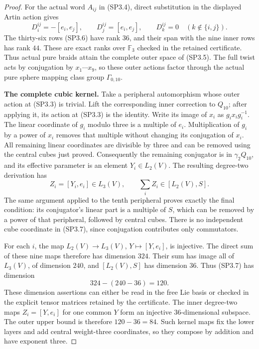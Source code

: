 \begin{proof}
For the actual word $A_{ij}$ in (SP3.4), direct substitution in
the displayed Artin action gives
\[
 D^{ij}_i=-[e_i,e_j],\qquad D^{ij}_j=[e_i,e_j],
 \qquad D^{ij}_k=0\quad(k\notin\{i,j\}).                \tag{SP3.6}
\]
The thirty-six rows (SP3.6) have rank $36$, and their span
with the nine inner rows has rank $44$.  These are exact ranks
over $\mathbb F_3$ checked in the retained certificate.  Thus
actual pure braids attain the complete outer space of (SP3.5).
The full twist acts by conjugation by $x_1\cdots x_9$, so
these outer actions factor through the actual pure sphere
mapping class group $\Gamma_{0,10}$.

\par\medskip\noindent\textbf{The complete cubic kernel.}\quad
Take a peripheral automorphism whose outer action at (SP3.3)
is trivial.  Lift the corresponding inner correction to
$Q_{10}$; after applying it, its action at (SP3.3) is the
identity.  Write its image of $x_i$ as $g_ix_ig_i^{-1}$.
The linear coordinate of $g_i$ modulo three is a multiple of
$e_i$.  Multiplication of $g_i$ by a power of $x_i$ removes
that multiple without changing its conjugation of $x_i$.
All remaining linear coordinates are divisible by three and
can be removed using the central cubes just proved.
Consequently the remaining conjugator is in $\gamma_2Q_{10}$,
and its effective parameter is an element $Y_i\in L_2(V)$.
The resulting degree-two derivation has
\[
 Z_i=[Y_i,e_i]\in L_3(V),\qquad
             \sum_i Z_i\in[L_2(V),S].                 \tag{SP3.7}
\]
The same argument applied to the tenth peripheral proves
exactly the final condition: its conjugator's linear part is
a multiple of $S$, which can be removed by a power of that
peripheral, followed by central cubes.  There is no independent
cube coordinate in (SP3.7), since conjugation contributes only
commutators.

For each $i$, the map $L_2(V)\to L_3(V)$,
$Y\mapsto[Y,e_i]$, is injective.  The direct sum of these nine
maps therefore has dimension $324$.  Their sum has image all
of $L_3(V)$, of dimension $240$, and
$[L_2(V),S]$ has dimension $36$.  Thus (SP3.7) has dimension
\[
             324-(240-36)=120.                         \tag{SP3.8}
\]
These dimension assertions can either be read in the free Lie
basis or checked in the explicit tensor matrices retained by
the certificate.  The inner degree-two maps
$Z_i=[Y,e_i]$ for one common $Y$ form an injective
$36$-dimensional subspace.  The outer upper bound is therefore
$120-36=84$.  Such kernel maps fix the lower layers and add
central weight-three coordinates, so they compose by addition
and have exponent three.


\end{proof}
